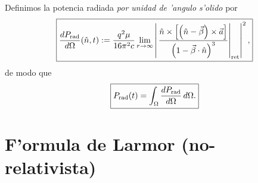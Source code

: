 Definimos la potencia radiada \textit{por unidad de 'angulo s'olido}
por
\begin{equation}
 \boxed{\frac{dP_{\rm rad}}{d\Omega}(\hat{n},t):=\frac{q^2\mu}{16\pi^2c}\lim_{r\rightarrow\infty} \left|\left.
\frac{\hat{n}\times\left[ \left( \hat{n}-\vec{\beta}\right)
\times{\vec{a}}\right] }{\left( 1-\vec{\beta}\cdot\hat{n}\right)
^3}\right|_{\rm ret}\right|^2 ,} \label{dPdO}
\end{equation}
de modo que
\begin{equation}
 \boxed{P_{\rm rad}(t)=\int_\Omega \frac{dP_{\rm rad}}{d\Omega}\,d\Omega.}
\end{equation}


\section{F'ormula de Larmor (no-relativista)}\label{sec:Larmor-norel}

